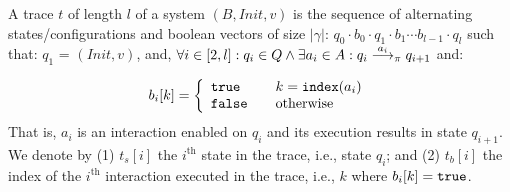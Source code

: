 \begin{definition}[Trace]
A trace $t$ of length $l$ of a system $(B,\mathit{Init}, v)$ is the sequence of alternating states/configurations and boolean vectors of size $|\gamma|$: $q_0\cdot b_0\cdot q_1\cdot b_1\cdots b_{l-1}\cdot q_l$ such that: $q_1$ = $(\mathit{Init}, v)$, and, $\forall i\in [2,l]: q_i\in Q \wedge \exists a_i\in A: q_i \goesto[a_i]_\pi q_{i+1}$ and: 

\[ b_i[k] = \left\{ 
  \begin{array}{l l}
    \true & \quad k = \mathtt{index}(a_i)\\
    \false & \quad \text{otherwise}
  \end{array} \right.\]
That is, $a_i$ is an interaction enabled on $q_i$ and its execution results in state $q_{i+1}$. We denote by (1) $t_s[i]$ the $i^{\text{th}}$ state in the trace, i.e., state $q_i$; and (2) $t_b[i]$ the index of the $i^{\text{th}}$ interaction executed in the trace, i.e., $k$ where $b_i[k] = \true$.
\end{definition}



 